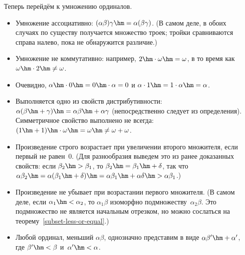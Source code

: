 \medskip
Теперь перейдём к умножению ординалов.
\begin{itemize}
\item Умножение ассоциативно: $(\alpha\beta)\gamma\hm=
\alpha(\beta\gamma)$. (В самом деле, в обоих случаях
по существу получается множество троек; тройки сравниваются
справа налево, пока не обнаружится различие.)
\item Умножение не коммутативно: например, $2\hm\cdot\omega\hm=\omega$,
в то время как $\omega\hm\cdot 2\hm\ne\omega$.
\item Очевидно, $\alpha\hm\cdot0\hm=0\hm\cdot\alpha=0$ и
$\alpha\cdot1\hm=1\cdot\alpha\hm=\alpha$.
\item Выполняется одно из свойств дистрибутивности:
$\alpha(\beta\hm+\gamma)\hm=\alpha\beta\hm+\alpha\gamma$
(непосредственно следует из определения). Симметричное свойство
выполнено не всегда: $(1\hm+1)\hm\cdot\omega\hm=\omega\hm\ne\omega+\omega$.
\item Произведение строго возрастает при увеличении второго
множителя, если первый не равен~$0$. (Для разнообразия выведем
это из ранее доказанных свойств: если $\beta_2\hm>\beta_1$, то
$\beta_2\hm=\beta_1\hm+\delta$, так что
$\alpha\beta_2\hm=\alpha(\beta_1\hm+\delta)
\hm=\alpha\beta_1 \hm+\alpha\delta
\hm>\alpha\beta_1$.)
\item Произведение не убывает при возрастании первого множителя.
(В самом деле, если $\alpha_1\hm<\alpha_2$, то
$\alpha_1\beta$ изоморфно
подмножеству~$\alpha_2\beta$. Это подмножество не является
начальным отрезком, но можно сослаться на
теорему~\ref{subset-less-or-equal}.)
\label{ordinal-product-structure}%
\item Любой ординал, меньший $\alpha\beta$, однозначно
представим в виде $\alpha\beta'\hm+\alpha'$, где $\beta'\hm<\beta$
и~$\alpha'\hm<\alpha$.


\end{itemize}
